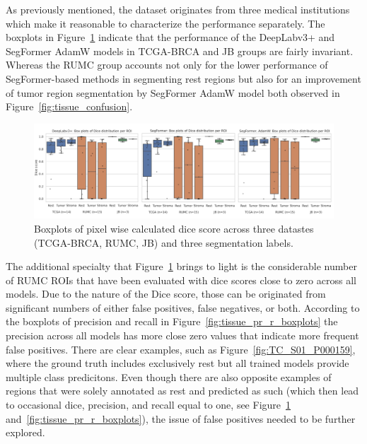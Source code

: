 As previously mentioned, the dataset originates from three medical
institutions which make it reasonable to characterize the performance separately.
The boxplots in Figure~\ref*{fig:tissue_dice_boxplots} indicate that the performance of
the DeepLabv3+ and SegFormer AdamW models in TCGA-BRCA and JB groups are fairly invariant.
Whereas the RUMC group accounts not only for the lower performance of SegFormer-based methods
in segmenting rest regions but also for an improvement of tumor region segmentation by SegFormer AdamW
model both observed in Figure~\ref*{fig:tissue_confusion}.

\begin{figure}[H]
    \includegraphics[width=\linewidth]{figures/tissue/dices.png}
    \caption{Boxplots of pixel wise calculated dice score across three datastes (TCGA-BRCA, RUMC, JB) and three segmentation labels.}
    \label{fig:tissue_dice_boxplots}
\end{figure} 

The additional specialty that Figure~\ref*{fig:tissue_dice_boxplots} brings to light is
the considerable number of RUMC ROIs that have been evaluated with dice scores close to
zero across all models. Due to the nature of the Dice score, those can be originated from
significant numbers of either false positives, false negatives, or both.
According to the boxplots of precision and recall in Figure~\ref*{fig:tissue_pr_r_boxplots}
the precision across all models has more close zero values that indicate more frequent
false positives. 
There are clear examples, such as Figure~\ref*{fig:TC_S01_P000159},
where the ground truth includes exclusively rest but all trained models provide multiple class predicitons.
Even though there are also opposite examples of regions that were solely annotated as rest and predicted as
such (which then lead to occasional dice, precision, and recall equal to one, see Figure~\ref*{fig:tissue_dice_boxplots}
and~\ref*{fig:tissue_pr_r_boxplots}), the issue of false positives needed to be further explored.

